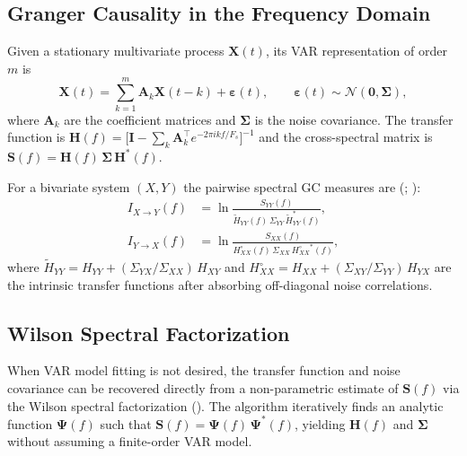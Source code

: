 \documentclass[10pt,a4paper,onecolumn]{article}
\begin{document}
\subsection{Granger Causality in the Frequency Domain}\label{gc-background}

Given a stationary multivariate process \(\mathbf{X}(t)\), its VAR
representation of order \(m\) is
\begin{equation}
  \mathbf{X}(t) = \sum_{k=1}^{m} \mathbf{A}_k \mathbf{X}(t-k) +
  \boldsymbol{\varepsilon}(t),
  \qquad
  \boldsymbol{\varepsilon}(t) \sim \mathcal{N}(\mathbf{0}, \boldsymbol{\Sigma}),
\end{equation}
where \(\mathbf{A}_k\) are the coefficient matrices and
\(\boldsymbol{\Sigma}\) is the noise covariance. The transfer function is
\(\mathbf{H}(f) = \bigl[\mathbf{I} - \sum_k \mathbf{A}_k^{\top}
e^{-2\pi i k f / F_s}\bigr]^{-1}\) and the cross-spectral matrix is
\(\mathbf{S}(f) = \mathbf{H}(f)\,\boldsymbol{\Sigma}\,\mathbf{H}^*(f)\).

For a bivariate system \((X, Y)\) the pairwise spectral GC measures are
(;
):
\begin{align}
  I_{X \to Y}(f) &= \ln \frac{S_{YY}(f)}
    {\tilde{H}_{YY}(f)\,\Sigma_{YY}\,\tilde{H}_{YY}^*(f)}, \\
  I_{Y \to X}(f) &= \ln \frac{S_{XX}(f)}
    {H_{XX}^{\circ}(f)\,\Sigma_{XX}\,{H_{XX}^{\circ}}^*(f)},
\end{align}
where \(\tilde{H}_{YY} = H_{YY} + (\Sigma_{YX}/\Sigma_{XX})\,H_{XY}\)
and \(H_{XX}^{\circ} = H_{XX} + (\Sigma_{XY}/\Sigma_{YY})\,H_{YX}\)
are the intrinsic transfer functions after absorbing off-diagonal noise
correlations.

\subsection{Wilson Spectral Factorization}\label{wilson}

When VAR model fitting is not desired, the transfer function and noise
covariance can be recovered directly from a non-parametric estimate of
\(\mathbf{S}(f)\) via the Wilson spectral factorization
(). The algorithm iteratively
finds an analytic function \(\boldsymbol{\Psi}(f)\) such that
\(\mathbf{S}(f) = \boldsymbol{\Psi}(f)\,\boldsymbol{\Psi}^*(f)\),
yielding \(\mathbf{H}(f)\) and \(\boldsymbol{\Sigma}\) without
assuming a finite-order VAR model.
\end{document}
